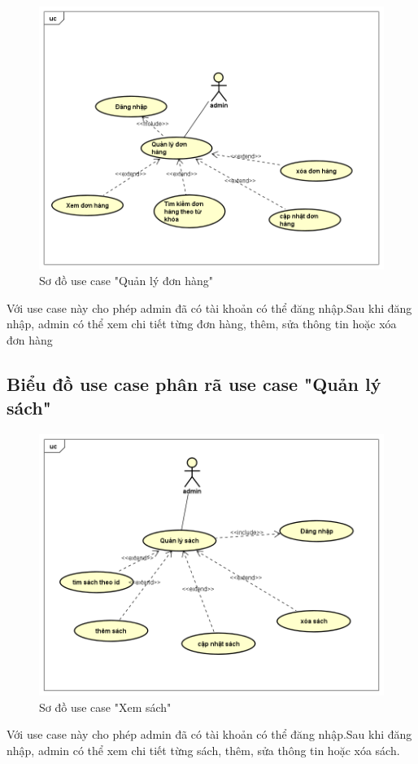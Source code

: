 \documentclass[../DoAn.tex]{subfiles}
\begin{document}
\begin{figure}[H] %
\centering
\includegraphics[width=1\linewidth]{Hinhve/quản lý đơn hàng.png}
\caption{Sơ đồ use case "Quản lý đơn hàng"}
\label{fig:UsecaseControlOrder}
\end{figure}
Với use case này cho phép admin đã có tài khoản có thể đăng nhập.Sau khi đăng nhập, admin có thể xem chi tiết từng đơn hàng, thêm, sửa thông tin hoặc xóa đơn hàng

\subsection{Biểu đồ use case phân rã use case "Quản lý sách"}
\label{subsection:2.2.7}

\begin{figure}[H] %
\centering
\includegraphics[width=1\linewidth]{Hinhve/quản lý sách.png}
\caption{Sơ đồ use case "Xem sách"}
\label{fig:UsecaseControlBook}
\end{figure}
Với use case này cho phép admin đã có tài khoản có thể đăng nhập.Sau khi đăng nhập, admin có thể xem chi tiết từng sách, thêm, sửa thông tin hoặc xóa sách.
\end{document}
